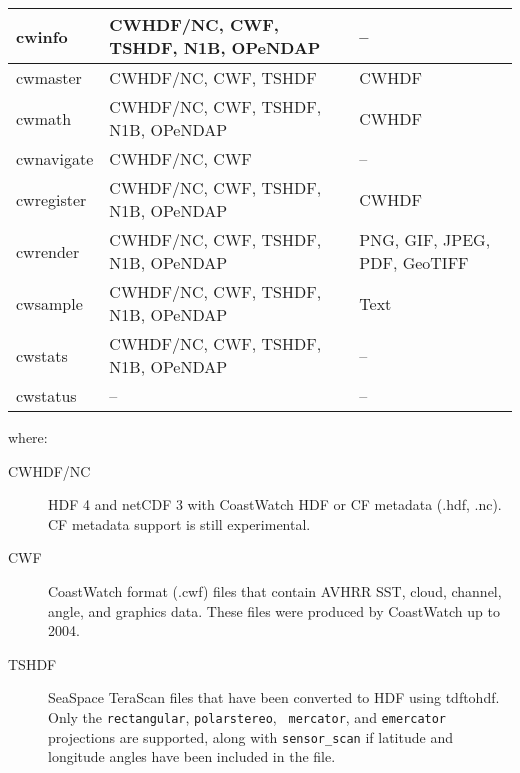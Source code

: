 {\begin{tabular}{|l|p{5cm}|p{5cm}|}
  cwinfo & CWHDF/NC, CWF, TSHDF, N1B, OPeNDAP & -- \\ \hline

  cwmaster & CWHDF/NC, CWF, TSHDF & CWHDF \\ \hline

  cwmath & CWHDF/NC, CWF, TSHDF, N1B, OPeNDAP & CWHDF \\ \hline

  cwnavigate & CWHDF/NC, CWF & -- \\ \hline

  cwregister & CWHDF/NC, CWF, TSHDF, N1B, OPeNDAP & CWHDF \\ \hline


  cwrender & CWHDF/NC, CWF, TSHDF, N1B, OPeNDAP & PNG, GIF, JPEG, PDF,
  GeoTIFF \\ \hline

  cwsample & CWHDF/NC, CWF, TSHDF, N1B, OPeNDAP & Text \\ \hline

  cwstats & CWHDF/NC, CWF, TSHDF, N1B, OPeNDAP & -- \\ \hline

  cwstatus & -- & -- \\ \hline

\end{tabular}

where:

\begin{description}

  \item[CWHDF/NC] HDF 4 and netCDF 3 with CoastWatch HDF or CF
  metadata (.hdf, .nc).  CF metadata support is still experimental.

  \item[CWF] CoastWatch format (.cwf) files that contain AVHRR SST, cloud,
  channel, angle, and graphics data.  These files were produced by
  CoastWatch up to 2004.

  \item[TSHDF] SeaSpace TeraScan files that have been converted to HDF
  using tdftohdf.  Only the {\tt rectangular}, {\tt polarstereo}, {\tt
  mercator}, and {\tt emercator} projections are supported, along with
  {\tt sensor\_scan} if latitude and longitude angles have been
  included in the file.


\end{description}}
